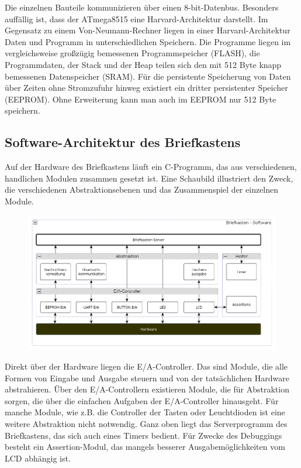 \documentclass[ngerman]{article}
\begin{document}
Die einzelnen Bauteile kommunizieren über einen 8-bit-Datenbus. Besonders auffällig ist,
dass der ATmega8515 eine Harvard-Architektur darstellt. Im Gegensatz zu einem
Von-Neumann-Rechner liegen in einer Harvard-Architektur Daten und Programm in
unterschiedlichen Speichern. Die Programme liegen im vergleichsweise großzügig bemessenen
Programmspeicher (FLASH), die Programmdaten, der Stack und der Heap teilen sich den
mit 512 Byte knapp bemessenen Datenspeicher (SRAM). Für die persistente Speicherung
von Daten über Zeiten ohne Stromzufuhr hinweg existiert ein dritter persistenter Speicher (EEPROM).
Ohne Erweiterung kann man auch im EEPROM nur 512 Byte speichern.


        \subsection{Software-Architektur des Briefkastens}

Auf der Hardware des Briefkastens läuft ein C-Programm, das aus verschiedenen, handlichen Modulen
zusammen gesetzt ist. Eine Schaubild illustriert den Zweck, die verschiedenen Abstraktionsebenen
und das Zusammenspiel der einzelnen Module.

\begin{figure}[h!] \begin{center}
    \includegraphics[width=\textwidth]{media/letterbox-arch}
\end{center} \end{figure}

Direkt über der Hardware liegen die E/A-Controller. Das sind Module, die alle Formen von Eingabe
und Ausgabe steuern und von der tatsächlichen Hardware abstrahieren. Über den E/A-Controllern
existieren Module, die für Abstraktion sorgen, die über die einfachen Aufgaben der E/A-Controller
hinausgeht. Für manche Module, wie z.B. die Controller der Tasten oder Leuchtdioden ist eine weitere
Abstraktion nicht notwendig. Ganz oben liegt das Serverprogramm des Briefkastens, das sich auch
eines Timers bedient. Für Zwecke des Debuggings besteht ein Assertion-Modul, das mangels besserer
Ausgabemöglichkeiten vom LCD abhängig ist.
\end{document}
